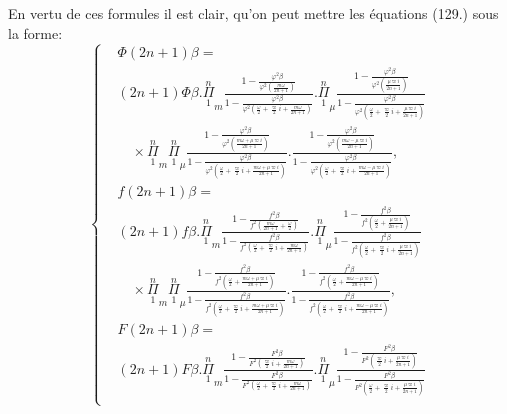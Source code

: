 \documentclass{article}
\begin{document}
En vertu de ces formules il est clair, qu'on peut mettre les équations (129.) sous la forme:
\[ \left\{\begin{aligned}
&\Phi(2n+1)\beta=\\
&(2n+1)\Phi\beta.\overset{n}{\underset{1}{\Pi}}_{m}\frac{1-\frac{\varphi^{2}\beta}{\varphi^{2}\left(\frac{m\omega}{2n+1}\right)}}{1-\frac{\varphi^{2}\beta}{\varphi^{2}\left(\frac{\omega}{2}+\frac{\varpi}{2}i+\frac{m\omega}{2n+1}\right)}}.\overset{n}{\underset{1}{\Pi}}_{\mu}\frac{1-\frac{\varphi^{2}\beta}{\varphi^{2}\left(\frac{\mu\varpi i}{2n+1}\right)}}{1-\frac{\varphi^{2}\beta}{\varphi^{2}\left(\frac{\omega}{2}+\frac{\varpi}{2}i+\frac{\mu\varpi i}{2n+1}\right)}}\\
&\quad\times\overset{n}{\underset{1}{\Pi}}_{m}\overset{n}{\underset{1}{\Pi}}_{\mu}\frac{1-\frac{\varphi^{2}\beta}{\varphi^{2}\left(\frac{m\omega+\mu\varpi i}{2n+1}\right)}}{1-\frac{\varphi^{2}\beta}{\varphi^{2}\left(\frac{\omega}{2}+\frac{\varpi}{2}i+\frac{m\omega+\mu\varpi i}{2n+1}\right)}}.\frac{1-\frac{\varphi^{2}\beta}{\varphi^{2}\left(\frac{m\omega-\mu\varpi i}{2n+1}\right)}}{1-\frac{\varphi^{2}\beta}{\varphi^{2}\left(\frac{\omega}{2}+\frac{\varpi}{2}i+\frac{m\omega-\mu\varpi i}{2n+1}\right)}},\\
&f(2n+1)\beta=\\
&(2n+1)f\beta.\overset{n}{\underset{1}{\Pi}}_{m}\frac{1-\frac{f^{2}\beta}{f^{2}\left(\frac{m\omega}{2n+1}+\frac{\omega}{2}\right)}}{1-\frac{f^{2}\beta}{f^{2}\left(\frac{\omega}{2}+\frac{\varpi}{2}i+\frac{m\omega}{2n+1}\right)}}.\overset{n}{\underset{1}{\Pi}}_{\mu}\frac{1-\frac{f^{2}\beta}{f^{2}\left(\frac{\omega}{2}+\frac{\mu\varpi i}{2n+1}\right)}}{1-\frac{f^{2}\beta}{f^{2}\left(\frac{\omega}{2}+\frac{\varpi}{2}i+\frac{\mu\varpi i}{2n+1}\right)}}\\
&\quad\times\overset{n}{\underset{1}{\Pi}}_{m}\overset{n}{\underset{1}{\Pi}}_{\mu}\frac{1-\frac{f^{2}\beta}{f^{2}\left(\frac{\omega}{2}+\frac{m\omega+\mu\varpi i}{2n+1}\right)}}{1-\frac{f^{2}\beta}{f^{2}\left(\frac{\omega}{2}+\frac{\varpi}{2}i+\frac{m\omega+\mu\varpi i}{2n+1}\right)}}.\frac{1-\frac{f^{2}\beta}{f^{2}\left(\frac{\omega}{2}+\frac{m\omega-\mu\varpi i}{2n+1}\right)}}{1-\frac{f^{2}\beta}{f^{2}\left(\frac{\omega}{2}+\frac{\varpi}{2}i+\frac{m\omega-\mu\varpi i}{2n+1}\right)}},\\
&F(2n+1)\beta=\\
&(2n+1)F\beta.\overset{n}{\underset{1}{\Pi}}_{m}\frac{1-\frac{F^{2}\beta}{F^{2}\left(\frac{\varpi}{2}i+\frac{m\omega}{2n+1}\right)}}{1-\frac{F^{2}\beta}{F^{2}\left(\frac{\omega}{2}+\frac{\varpi}{2}i+\frac{m\omega}{2n+1}\right)}}.\overset{n}{\underset{1}{\Pi}}_{\mu}\frac{1-\frac{F^{2}\beta}{F^{2}\left(\frac{\varpi}{2}i+\frac{\mu\varpi i}{2n+1}\right)}}{1-\frac{F^{2}\beta}{F^{2}\left(\frac{\omega}{2}+\frac{\varpi}{2}i+\frac{\mu\varpi i}{2n+1}\right)}}\\

\end{aligned}\]
\end{document}
